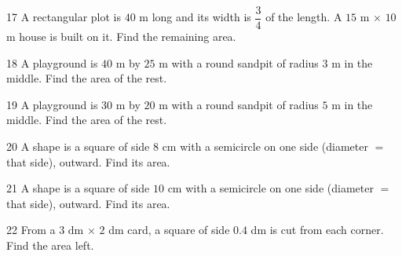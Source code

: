 \gap
\begin{probbox}{17}{\relax}
A rectangular plot is $40$ m long and its width is $\dfrac{3}{4}$ of the length. A $15$ m $\times$ $10$ m house is built on it. Find the remaining area.
\end{probbox}
\gap
\begin{probbox}{18}{\relax}
A playground is $40$ m by $25$ m with a round sandpit of radius $3$ m in the middle. Find the area of the rest.
\end{probbox}
\gap
\begin{probbox}{19}{\relax}
A playground is $30$ m by $20$ m with a round sandpit of radius $5$ m in the middle. Find the area of the rest.
\end{probbox}
\gap
\begin{probbox}{20}{\relax}
A shape is a square of side $8$ cm with a semicircle on one side (diameter $=$ that side), outward. Find its area.
\end{probbox}
\gap
\begin{probbox}{21}{\relax}
A shape is a square of side $10$ cm with a semicircle on one side (diameter $=$ that side), outward. Find its area.
\end{probbox}
\gap
\begin{probbox}{22}{\relax}
From a $3$ dm $\times$ $2$ dm card, a square of side $0.4$ dm is cut from each corner. Find the area left.
\end{probbox}
